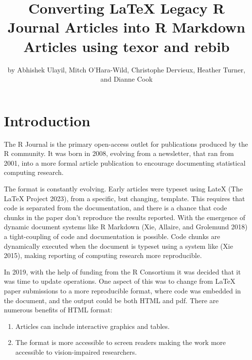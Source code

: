 \title{Converting LaTeX Legacy R Journal Articles into R Markdown Articles using texor and rebib}


\author{by Abhishek Ulayil, Mitch O'Hara-Wild, Christophe Dervieux, Heather Turner, and Dianne Cook}

\maketitle


\hypertarget{introduction}{%
\section{Introduction}\label{introduction}}

The R Journal is the primary open-access outlet for publications produced by the R community. It was born in 2008, evolving from a newsletter, that ran from 2001, into a more formal article publication to encourage documenting statistical computing research.

The format is constantly evolving. Early articles were typeset using LateX (The LaTeX Project 2023), from a specific, but changing, template. This requires that code is separated from the documentation, and there is a chance that code chunks in the paper don't reproduce the results reported. With the emergence of dynamic document systems like R Markdown (Xie, Allaire, and Grolemund 2018) a tight-coupling of code and documentation is possible. Code chunks are dynamically executed when the document is typeset using a system like  (Xie 2015), making reporting of computing research more reproducible.

In 2019, with the help of funding from the R Consortium it was decided that it was time to update operations. One aspect of this was to change from LaTeX paper submissions to a more reproducible format, where code was embedded in the document, and the output could be both HTML and pdf. There are numerous benefits of HTML format:

\begin{enumerate}
\def\labelenumi{\arabic{enumi}.}
\tightlist
\item
  Articles can include interactive graphics and tables.
\item
  The format is more accessible to screen readers making the work more accessible to vision-impaired researchers.
\end{enumerate}

